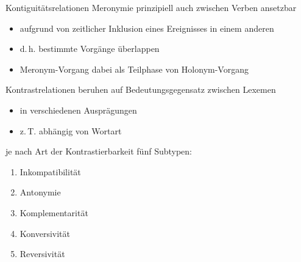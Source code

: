 \begin{frame}{Kontiguitätsrelationen}
\onslide<+->
Meronymie prinzipiell auch zwischen Verben ansetzbar
\begin{itemize}[<+->]
	\item		aufgrund von zeitlicher Inklusion eines Ereignisses in einem anderen
	\item		d.\,h. bestimmte Vorgänge überlappen
	\item		Meronym-Vorgang dabei als Teilphase von Holonym-Vorgang
\end{itemize}
\onslide<+->
\Zeile
\begin{exe}
	\ex\label{ex:kontiguitaetsrelationen-003}
    \begin{xlist}
		\onslide<+->
	\end{xlist}
\end{exe}
\end{frame}

\begin{frame}{Kontrastrelationen}
\onslide<+->
beruhen auf Bedeutungsgegensatz zwischen Lexemen
\begin{itemize}[<+->]
	\item		in verschiedenen Ausprägungen
	\item		z.\,T. abhängig von Wortart
\end{itemize}
\onslide<+->
\Zeile
je nach Art der Kontrastierbarkeit fünf Subtypen:
\begin{enumerate}[<+->]
	\item		Inkompatibilität
	\item		Antonymie
	\item		Komplementarität
	\item		Konversivität
	\item		Reversivität
\end{enumerate}
\end{frame}

